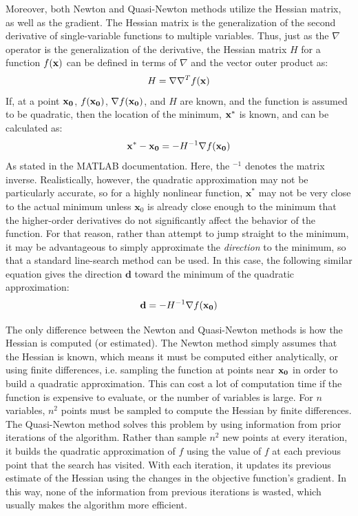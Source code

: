 \documentclass[twoside]{report} %
\begin{document}
Moreover, both Newton and Quasi-Newton methods utilize the Hessian matrix, as well as the gradient. The Hessian matrix is the
generalization of the second derivative of single-variable functions to multiple variables. Thus, just as the $\nabla$ operator
is the generalization of the derivative, the Hessian matrix $H$ for a function $f(\bf x)$ can be defined in terms of $\nabla$ and
the vector outer product as:
\[ H = \nabla \nabla^T f(\bf x) \]
If, at a point $\bf x_0$, $f(\bf x_0)$, $\nabla f(\bf x_0)$, and $H$ are known, and the function is assumed to be quadratic, then
the location of the minimum, $\bf x^*$ is known, and can be calculated as:
\[ \mathbf{x^*}-\mathbf{x_0} = -H^{-1} \nabla f(\bf x_0) \]
As stated in the MATLAB documentation. Here, the $^{-1}$ denotes the matrix inverse. Realistically, however, the quadratic
approximation may not be particularly accurate, so for a highly nonlinear function, $ \mathbf x^*$ may not be very close to the actual
minimum unless $\mathbf x_0$ is already close enough to the minimum that the higher-order derivatives do not significantly affect the
behavior of the function. For that reason, rather than attempt to jump straight to the minimum, it may be advantageous to simply
approximate the \textit{direction} to the minimum, so that a standard line-search method can be used. In this case, the following
similar equation gives the direction $\mathbf{d}$ toward the minimum of the quadratic approximation:
\[ \mathbf{d} = -H^{-1} \nabla f(\bf x_0) \]

The only difference between the Newton and Quasi-Newton methods is how the Hessian is computed (or estimated). The Newton
method simply assumes that the Hessian is known, which means it must be computed either analytically, or using finite differences,
i.e. sampling the function at points near $\bf x_0$ in order to build a quadratic approximation. This can cost a lot of computation
time if the function is expensive to evaluate, or the number of variables is large. For $n$ variables, $n^2$ points must be sampled
to compute the Hessian by finite differences. The Quasi-Newton method solves this problem by using information from prior iterations
of the algorithm. Rather than sample $n^2$ new points at every iteration, it builds the quadratic approximation of $f$ using the value
of $f$ at each previous point that the search has visited. With each iteration, it updates its previous estimate of the Hessian
using the changes in the objective function's gradient. In this way, none of the information from previous iterations is wasted,
which usually makes the algorithm more efficient.
\end{document}
